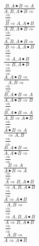 \documentclass[11pt]{article}
\begin{document}
\begin{center}
\bigskip
\\$\frac{B, A\bullet B\Rightarrow A}{A, B, A\bullet B\Rightarrow }$
\bigskip
\\$\frac{\Rightarrow }{\Rightarrow }$
\bigskip
\\$\frac{B\Rightarrow A, A\bullet B}{A, B, A\bullet B\Rightarrow }$
\bigskip
\\$\frac{\Rightarrow }{\Rightarrow }$
\bigskip
\\$\frac{A, B, A\bullet B\Rightarrow }{B\Rightarrow A, A\bullet B}$
\bigskip
\\$\frac{\Rightarrow }{\Rightarrow }$
\bigskip
\\$\frac{\Rightarrow A, A\bullet B}{\Rightarrow B, A\bullet B}$
\bigskip
\\$\frac{\Rightarrow }{\Rightarrow }$
\bigskip
\\$\frac{A, A\bullet B\Rightarrow }{A, B\Rightarrow }$
\bigskip
\\$\frac{\Rightarrow }{\Rightarrow }$
\bigskip
\\$\frac{B, A\bullet B\Rightarrow A}{A, A\bullet B\Rightarrow B}$
\bigskip
\\$\frac{\Rightarrow }{\Rightarrow }$
\bigskip
\\$\frac{B, A\bullet B\Rightarrow A}{A, B\Rightarrow A\bullet B}$
\bigskip
\\$\frac{\Rightarrow }{\Rightarrow }$
\bigskip
\\$\frac{A\bullet B\Rightarrow A}{\Rightarrow A, B}$
\bigskip
\\$\frac{\Rightarrow }{\Rightarrow }$
\bigskip
\\$\frac{B, A\bullet B\Rightarrow }{A, A\bullet B\Rightarrow }$
\bigskip
\\$\frac{\Rightarrow }{\Rightarrow }$
\bigskip
\\$\frac{B\Rightarrow A}{A\bullet B\Rightarrow A}$
\bigskip
\\$\frac{\Rightarrow }{\Rightarrow }$
\bigskip
\\$\frac{A\Rightarrow B, A\bullet B}{\Rightarrow A, B, A\bullet B}$
\bigskip
\\$\frac{\Rightarrow }{\Rightarrow }$
\bigskip
\\$\frac{A\Rightarrow A\bullet B}{A, B\Rightarrow }$
\bigskip
\\$\frac{\Rightarrow }{\Rightarrow }$
\bigskip
\\$\frac{\Rightarrow A, B, A\bullet B}{A\Rightarrow B, A\bullet B}$
\bigskip
\\$\frac{\Rightarrow }{\Rightarrow }$
\bigskip
\\$\frac{A, B\Rightarrow }{A\Rightarrow A\bullet B}$

\end{center}
\end{document}

